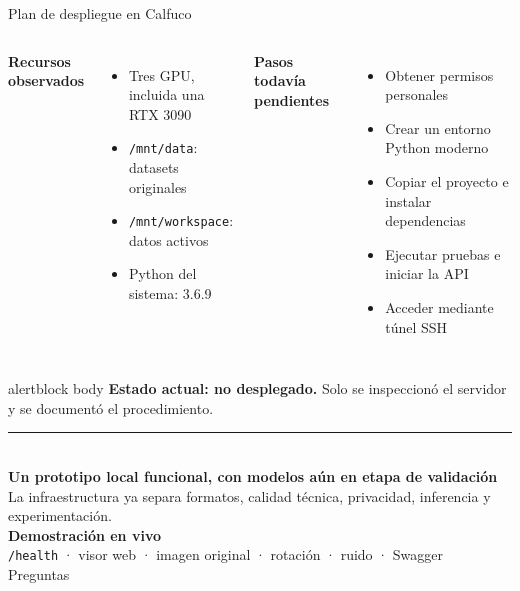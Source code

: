 \documentclass[aspectratio=169,10pt]{beamer}
\begin{document}
\begin{frame}{Plan de despliegue en Calfuco}
\begin{columns}[T,onlytextwidth]
{\bfseries\color{Navy}Recursos observados}
\begin{itemize}
  \item Tres GPU, incluida una RTX 3090
  \item \texttt{/mnt/data}: datasets originales
  \item \texttt{/mnt/workspace}: datos activos
  \item Python del sistema: 3.6.9
\end{itemize}
{\bfseries\color{Navy}Pasos todavía pendientes}
\begin{itemize}
  \item Obtener permisos personales
  \item Crear un entorno Python moderno
  \item Copiar el proyecto e instalar dependencias
  \item Ejecutar pruebas e iniciar la API
  \item Acceder mediante túnel SSH
\end{itemize}
\end{columns}
\vspace{0.5cm}
\begin{beamercolorbox}[rounded=true,sep=0.35cm]{alertblock body}
{\color{Coral}\bfseries Estado actual: no desplegado.} Solo se inspeccionó el servidor y se documentó el procedimiento.
\end{beamercolorbox}
\end{frame}

\begin{frame}[plain]
\vspace{1.25cm}
{\color{Cyan}\rule{2.1cm}{3pt}}\\[0.35cm]
{\fontsize{26}{30}\selectfont\bfseries\color{Navy}Un prototipo local funcional, con modelos aún en etapa de validación}\\[0.65cm]
{\large La infraestructura ya separa formatos, calidad técnica, privacidad, inferencia y experimentación.}\\[1.0cm]
{\color{Blue}\Large\bfseries Demostración en vivo}\\[0.25cm]
{\color{Muted}\texttt{/health} · visor web · imagen original · rotación · ruido · Swagger}\\[1cm]
{\large Preguntas}
\end{frame}
\end{document}
